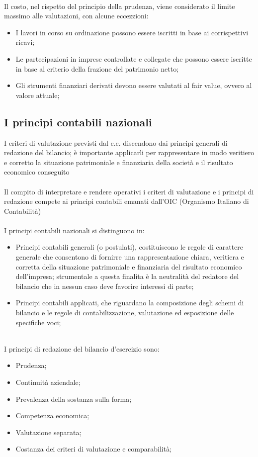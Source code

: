 \documentclass{report}
\begin{document}
\\
Il costo, nel rispetto del principio della prudenza, viene considerato il limite massimo alle valutazioni, con alcune eccezzioni:
\\
\begin{itemize}
  \item{I lavori in corso su ordinazione possono essere iscritti in base ai corrispettivi ricavi;}
  \item{Le partecipazioni in imprese controllate e collegate che possono essere iscritte in base al criterio della frazione del patrimonio netto;}
  \item{Gli strumenti finanziari derivati devono essere valutati al fair value, ovvero al valore attuale;}
\end{itemize}
\subsection{I principi contabili nazionali} %
\label{sub:I principi contabili nazionali}
I criteri di valutazione previsti dal c.c. discendono dai principi generali di redazione del bilancio; è importante applicarli per rappresentare in modo veritiero e corretto la situazione patrimoniale e finanziaria della società e il risultato economico conseguito
\\
\\
Il compito di interpretare e rendere operativi i criteri di valutazione e i principi di redazione compete ai principi contabili emanati dall'OIC (Organismo Italiano di Contabilità)
\\
\\
I principi contabili nazionali si distinguono in:
\\
\begin{itemize}
  \item{Principi contabili generali (o postulati), costituiscono le regole di carattere generale che consentono di fornirre una rappresentazione chiara, veritiera e corretta della situazione patrimoniale e finanziaria del risultato economico dell'impresa; strumentale a questa finalita è la neutralità del redatore del bilancio che in nessun caso deve favorire interessi di parte;}
  \item{Principi contabili applicati, che riguardano la composizione degli schemi di bilancio e le regole di contabilizzazione, valutazione ed esposizione delle specifiche voci;}
\end{itemize}
\\
I principi di redazione del bilancio d'esercizio sono:
\\
\begin{itemize}
  \item{Prudenza;}
  \item{Continuità aziendale;}
  \item{Prevalenza della sostanza sulla forma;}
  \item{Competenza economica;}
  \item{Valutazione separata;}
  \item{Costanza dei criteri di valutazione e comparabilità;}
\end{itemize}
\end{document}
